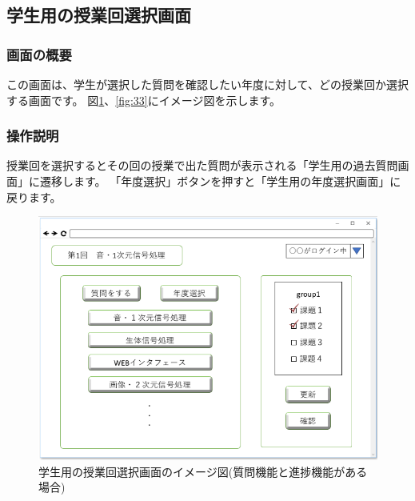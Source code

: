 
\newpage

\subsection{学生用の授業回選択画面}
\subsubsection{画面の概要}
この画面は、学生が選択した質問を確認したい年度に対して、どの授業回か選択する画面です。
図\ref{fig:32}、\ref{fig:33}にイメージ図を示します。

\subsubsection{操作説明}
授業回を選択するとその回の授業で出た質問が表示される「学生用の過去質問画面」に遷移します。
「年度選択」ボタンを押すと「学生用の年度選択画面」に戻ります。

\begin{figure}[phtbp]
  \begin{center}
    \includegraphics[width=0.55\linewidth,clip]{./img/32.png}
    \caption{学生用の授業回選択画面のイメージ図(質問機能と進捗機能がある場合)}\label{fig:32}
  \end{center}
\end{figure}

